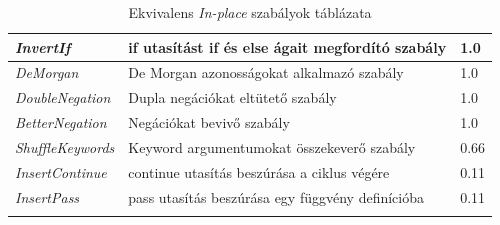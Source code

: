 \begin{center}
\begin{longtable}{ | p{} | p{} | p{} | }
		\emph{InvertIf}
		& if utasítást if és else ágait megfordító szabály
		& 1.0
		\\ \hline

		\emph{DeMorgan}
		& De Morgan azonosságokat alkalmazó szabály
		& 1.0
		\\ \hline

		\emph{DoubleNegation}
		& Dupla negációkat eltütető szabály
		& 1.0
		\\ \hline

		\emph{BetterNegation}
		& Negációkat bevivő szabály
		& 1.0
		\\ \hline

		\emph{ShuffleKeywords}
		& Keyword argumentumokat összekeverő szabály
		& 0.66
		\\ \hline

		\emph{InsertContinue}
		& continue utasítás beszúrása a ciklus végére
		& 0.11
		\\ \hline

		\emph{InsertPass}
		& pass utasítás beszúrása egy függvény definícióba
		& 0.11
		\\ \hline

		\caption{Ekvivalens \emph{In-place} szabályok táblázata}
		\label{tab:in-place-rules-eqv}
	\end{longtable}
\end{center}

